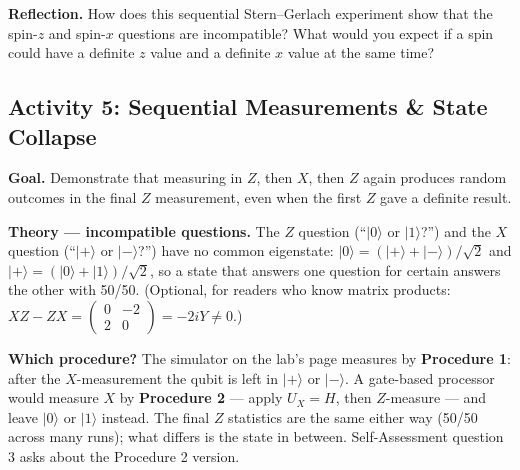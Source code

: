 \documentclass[a4paper,11pt]{article}
\newcommand{\keepspace}[1]{\par\vspace{0pt plus #1}\penalty-300\vspace{0pt plus -#1}}
\providecommand{\ket}[1]{|{#1}\rangle}
\begin{document}
\begin{studentbox}
\textbf{Reflection.} How does this sequential Stern--Gerlach experiment show that the
spin-$z$ and spin-$x$ questions are incompatible? What would you expect if a spin could
have a definite $z$ value and a definite $x$ value at the same time?
\end{studentbox}

\keepspace{8\baselineskip}
\subsection{Activity 5: Sequential Measurements \& State Collapse}

\begin{studentbox}
\textbf{Goal.} Demonstrate that measuring in $Z$, then $X$, then $Z$ again produces random
outcomes in the final $Z$ measurement, even when the first $Z$ gave a definite result.

\medskip
\textbf{Theory --- incompatible questions.} The $Z$ question (``$\ket{0}$ or $\ket{1}$?'')
and the $X$ question (``$\ket{+}$ or $\ket{-}$?'') have no common eigenstate:
$\ket{0} = (\ket{+} + \ket{-})/\sqrt 2$ and $\ket{+} = (\ket{0} + \ket{1})/\sqrt 2$, so a
state that answers one question for certain answers the other with 50/50. (Optional, for
readers who know matrix products:
$XZ - ZX = \begin{pmatrix}0&-2\\2&0\end{pmatrix} = -2iY \neq 0$.)

\medskip
\textbf{Which procedure?} The simulator on the lab's page measures by
\textbf{Procedure 1}: after the $X$-measurement the qubit is left in $\ket{+}$ or $\ket{-}$.
A gate-based processor would measure $X$ by \textbf{Procedure 2} --- apply $U_X = H$, then
$Z$-measure --- and leave $\ket{0}$ or $\ket{1}$ instead. The final $Z$ statistics are the
same either way (50/50 across many runs); what differs is the state in between.
Self-Assessment question 3 asks about the Procedure 2 version.


\end{studentbox}
\end{document}
